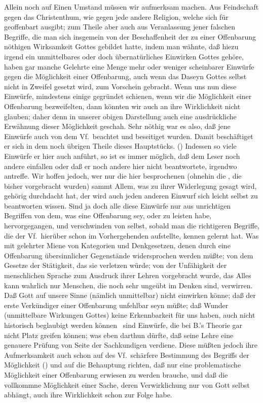 Allein noch auf Einen Umstand müssen wir aufmerksam machen. Aus Feindschaft gegen das Christenthum, wie gegen jede andere Religion, welche sich für geoffenbart ausgibt; zum Theile aber auch aus Veranlassung jener falschen Begriffe, die man sich insgemein von der Beschaffenheit der zu einer Offenbarung nöthigen Wirksamkeit Gottes gebildet hatte, indem man wähnte, daß hiezu irgend ein unmittelbares oder doch übernatürliches Einwirken Gottes gehöre, haben gar manche Gelehrte eine Menge mehr oder weniger scheinbarer Einwürfe gegen die Möglichkeit einer Offenbarung, auch wenn das Daseyn Gottes selbst nicht in Zweifel gesetzt wird, zum Vorschein gebracht. Wenn uns nun diese Einwürfe, mindestens einige gegründet schienen, wenn wir die Möglichkeit einer Offenbarung bezweifelten, dann könnten wir auch an ihre Wirklichkeit nicht glauben; daher denn in unserer obigen Darstellung auch eine ausdrückliche Erwähnung dieser Möglichkeit geschah. Sehr nöthig war es also, daß jene Einwürfe auch von dem Vf.\ beachtet und beseitiget wurden. Damit beschäftiget er sich in dem noch übrigen Theile dieses Hauptstücks. () Indessen so viele Einwürfe er hier auch anführt, so ist es immer möglich, daß dem Leser noch andere einfallen oder daß er noch andere hier nicht beantwortete, irgendwo antreffe. Wir hoffen jedoch, wer nur  die hier besprochenen (ohnehin die , die bisher vorgebracht wurden) sammt Allem, was zu ihrer Widerlegung gesagt wird, gehörig durchdacht hat, der wird auch jeden anderen Einwurf sich leicht selbst zu beantworten wissen. Sind ja doch alle diese Einwürfe nur aus unrichtigen Begriffen von dem, was eine Offenbarung sey, oder zu leisten habe, hervorgegangen, und verschwinden von selbst, sobald man die richtigeren Begriffe, die der Vf.\ hierüber schon im Vorhergehenden aufstellte, kennen gelernt hat. Was mit gelehrter Miene von Kategorien und Denkgesetzen, denen durch eine Offenbarung übersinnlicher Gegenstände widersprochen werden müßte; von dem Gesetze der Stätigkeit, das sie verletzen würde; von der Unfähigkeit der menschlichen Sprache zum Ausdruck ihrer Lehren vorgebracht wurde, das Alles kann wahrlich nur Menschen, die noch sehr ungeübt im Denken sind, verwirren. Daß Gott auf unsere Sinne (nämlich unmittelbar) nicht einwirken könne; daß der erste Verkündiger einer Offenbarung unfehlbar seyn müßte; daß Wunder (unmittelbare Wirkungen Gottes) keine Erkennbarkeit für uns haben, auch nicht historisch beglaubigt werden können \umA\  sind Einwürfe, die bei B.'s Theorie gar nicht Platz greifen können; was eben darthun dürfte, daß seine Lehre eine genauere Prüfung von Seite der Sachkundigen verdiene. Diese müßten jedoch ihre Aufmerksamkeit auch schon auf des Vf.\ schärfere Bestimmung des Begriffs der Möglichkeit () und auf die Behauptung richten, daß nur eine problematische Möglichkeit einer Offenbarung erwiesen zu werden brauche, und daß die vollkommne Möglichkeit einer Sache, deren Verwirklichung nur von Gott selbst abhängt, auch ihre Wirklichkeit schon zur Folge habe. \par
